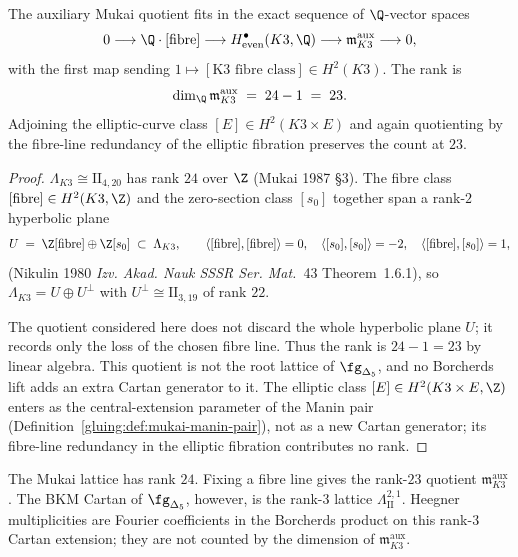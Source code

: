\begin{proposition}
\label{gluing:prop:cartan-count}
The auxiliary Mukai quotient fits in the exact sequence
of $\Q$-vector spaces
\[
 0 \longrightarrow \Q \cdot [\mathrm{fibre}]
 \longrightarrow H^\bullet_{\mathrm{even}}(K3, \Q)
 \longrightarrow \mathfrak m_{K3}^{\mathrm{aux}}
 \longrightarrow 0,
\]
with the first map sending $1 \mapsto [\text{K3 fibre class}] \in
H^2(K3)$. The rank is
\[
 \dim_\Q\mathfrak m_{K3}^{\mathrm{aux}} \;=\;
 24 - 1 \;=\; 23.
\]
Adjoining the elliptic-curve class $[E] \in H^2(K3 \times E)$ and
again quotienting by the fibre-line redundancy of the elliptic
fibration preserves the count at $23$.
\end{proposition}

\begin{proof}
$\Lambda_{K3} \cong \mathrm{II}_{4,20}$ has rank $24$ over $\Z$
(Mukai 1987 \S 3). The fibre class $[\mathrm{fibre}] \in H^2(K3,
\Z)$ and the zero-section class $[s_0]$ together span a rank-$2$
hyperbolic plane
\[
 U \;=\; \Z[\mathrm{fibre}] \oplus \Z[s_0] \;\subset\; \Lambda_{K3},
 \qquad
 \langle [\mathrm{fibre}], [\mathrm{fibre}]\rangle = 0,\quad
 \langle [s_0], [s_0]\rangle = -2,\quad
 \langle [\mathrm{fibre}], [s_0]\rangle = 1,
\]
(Nikulin 1980 \emph{Izv. Akad. Nauk SSSR Ser. Mat.}~43 Theorem~1.6.1),
so $\Lambda_{K3} = U \oplus U^\perp$ with $U^\perp \cong
\mathrm{II}_{3, 19}$ of rank $22$.

The quotient considered here does not discard the whole hyperbolic
plane \(U\); it records only the loss of the chosen fibre line. Thus
the rank is \(24-1=23\) by linear algebra. This quotient is not the
root lattice of \(\fg_{\Delta_5}\), and no Borcherds lift adds an
extra Cartan generator to it. The elliptic class
$[E] \in H^2(K3 \times E, \Z)$ enters
as the central-extension parameter of the Manin pair
(Definition~\ref{gluing:def:mukai-manin-pair}), not as a new Cartan
generator; its fibre-line redundancy in the elliptic fibration
contributes no rank.
\end{proof}

\begin{remark}
\label{gluing:rem:imaginary-cartan-rank}
The Mukai lattice has rank \(24\). Fixing a fibre line gives the
rank-\(23\) quotient \(\mathfrak m_{K3}^{\mathrm{aux}}\). The BKM
Cartan of \(\fg_{\Delta_5}\), however, is the rank-\(3\) lattice
\(\Lambda^{2,1}_{\mathrm{II}}\). Heegner multiplicities are Fourier
coefficients in the Borcherds product on this rank-\(3\) Cartan
extension; they are not counted by the dimension of
\(\mathfrak m_{K3}^{\mathrm{aux}}\).
\end{remark}

